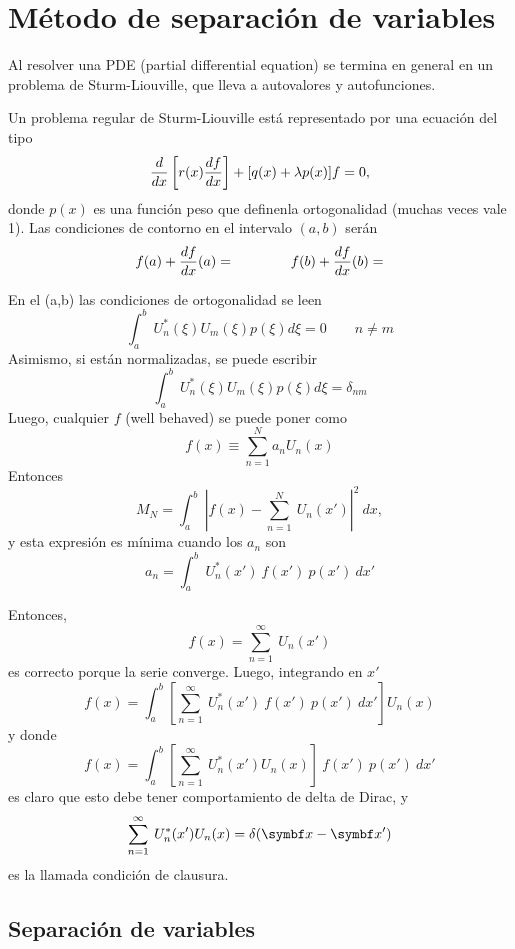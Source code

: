 \documentclass[10pt,oneside]{CBFT_book}
\begin{document}
\chapter{Método de separación de variables}

Al resolver una PDE (partial differential equation) se termina en general en un problema de
Sturm-Liouville, que lleva a autovalores y autofunciones.

Un problema regular de Sturm-Liouville está representado por una ecuación del tipo
\[
	\frac{d^{\hspace{-0.05em}} {}}{d {x}^{\hspace{-0.05em}}}\left[ r(x) \frac{d^{\hspace{-0.05em}} {f}}{d {x}^{\hspace{-0.05em}}} \right] + [ q(x) + \lambda p(x)] f = 0,
\]
donde $p(x)$ es una función peso que definenla ortogonalidad (muchas veces vale 1).
Las condiciones de contorno en el intervalo $(a,b)$ serán
\[	
	f(a) + \frac{d^{\hspace{-0.05em}} {f}}{d {x}^{\hspace{-0.05em}}}(a) = \qquad \qquad f(b) + \frac{d^{\hspace{-0.05em}} {f}}{d {x}^{\hspace{-0.05em}}}(b) =
\]

En el (a,b) las condiciones de ortogonalidad se leen
\[
	\int_a^b \: U_n^*(\xi) U_m(\xi) p(\xi) d\xi = 0 \qquad n \neq m
\]
Asimismo, si están normalizadas, se puede escribir
\[
	\int_a^b \: U_n^*(\xi) U_m(\xi) p(\xi) d\xi = \delta_{nm}
\]
Luego, cualquier $f$ (well behaved) se puede poner como
\[
	f(x) \equiv \sum_{n=1}^N a_n U_n(x)
\]
Entonces
\[
	M_N = \int_a^b \: \left| f(x) - \sum_{n=1}^N \: U_n(x') \right|^2 \: dx,
\]
y esta expresión es mínima cuando los $a_n$ son
\[
	a_n = \int_a^b \: U_n^*(x') \: f(x') \: p(x') \: dx'
\]

Entonces,
\[
	f(x) = \sum_{n=1}^\infty \: U_n(x')
\]
es correcto porque la serie converge. Luego, integrando en $x'$
\[
	f(x) = \int_a^b \left[ \sum_{n=1}^\infty \: U_n^*(x') \: f(x') \: p(x') \: dx' \right] U_n(x)
\]
y donde
\[
	f(x) = \int_a^b \left[ \sum_{n=1}^\infty \: U_n^*(x') U_n(x) \right] \: f(x') \: p(x') \: dx'
\]
es claro que esto debe tener comportamiento de delta de Dirac, y
\[
	\sum_{n=1}^\infty \: U_n^*(x') U_n(x) = \delta(\vbx-\vbx')
\]
es la llamada condición de clausura.

\section{Separación de variables}
\end{document}
